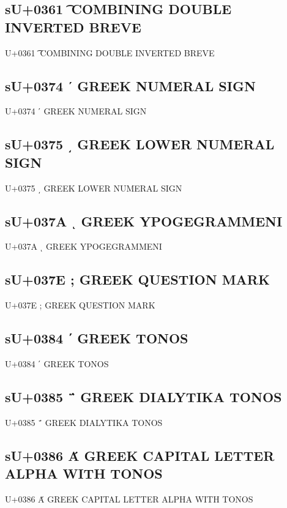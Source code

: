 \subsection{sU+0361 ͡ COMBINING DOUBLE INVERTED BREVE}

U+0361 ͡ COMBINING DOUBLE INVERTED BREVE

\iftestgreek

\subsection{sU+0374 ʹ GREEK NUMERAL SIGN}

U+0374 ʹ GREEK NUMERAL SIGN

\subsection{sU+0375 ͵ GREEK LOWER NUMERAL SIGN}

U+0375 ͵ GREEK LOWER NUMERAL SIGN

\subsection{sU+037A ͺ GREEK YPOGEGRAMMENI}

U+037A ͺ GREEK YPOGEGRAMMENI

\subsection{sU+037E ; GREEK QUESTION MARK}

U+037E ; GREEK QUESTION MARK

\subsection{sU+0384 ΄ GREEK TONOS}

U+0384 ΄ GREEK TONOS

\subsection{sU+0385 ΅ GREEK DIALYTIKA TONOS}

U+0385 ΅ GREEK DIALYTIKA TONOS

\subsection{sU+0386 Ά GREEK CAPITAL LETTER ALPHA WITH TONOS}

U+0386 Ά GREEK CAPITAL LETTER ALPHA WITH TONOS

